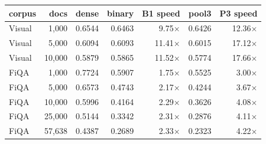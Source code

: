 \begin{tabular}{lrrrrrr}
\toprule
corpus & docs & dense & binary & B1 speed & pool3 & P3 speed \\
\midrule
Visual & 1,000 & 0.6544 & 0.6463 & 9.75$\times$ & 0.6426 & 12.36$\times$ \\
Visual & 5,000 & 0.6094 & 0.6093 & 11.41$\times$ & 0.6015 & 17.12$\times$ \\
Visual & 10,000 & 0.5879 & 0.5865 & 11.52$\times$ & 0.5774 & 17.66$\times$ \\
FiQA & 1,000 & 0.7724 & 0.5907 & 1.75$\times$ & 0.5525 & 3.00$\times$ \\
FiQA & 5,000 & 0.6573 & 0.4743 & 2.17$\times$ & 0.4244 & 3.67$\times$ \\
FiQA & 10,000 & 0.5996 & 0.4164 & 2.29$\times$ & 0.3626 & 4.08$\times$ \\
FiQA & 25,000 & 0.5144 & 0.3342 & 2.31$\times$ & 0.2876 & 4.11$\times$ \\
FiQA & 57,638 & 0.4387 & 0.2689 & 2.33$\times$ & 0.2323 & 4.22$\times$ \\
\bottomrule
\end{tabular}
